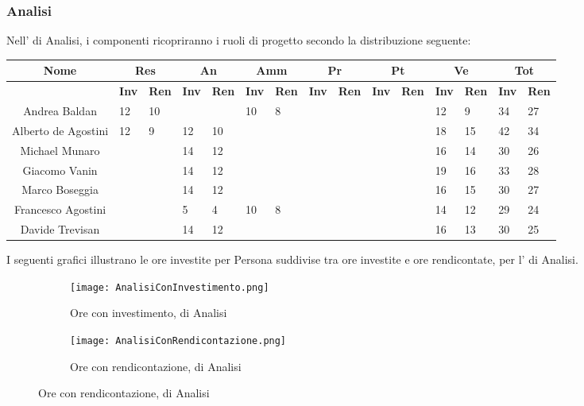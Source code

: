\documentclass{scalatekids-article}
\begin{document}
\subsubsection{Analisi}
Nell' di Analisi, i componenti ricopriranno i ruoli di progetto secondo la distribuzione seguente:
\begin{center}
  \scriptsize
  \begin{tabular}{| c | p{0.35cm} p{0.35cm} | p{0.35cm} p{0.35cm} | p{0.35cm} p{0.35cm} | p{0.35cm} p{0.35cm} | p{0.35cm} p{0.35cm} | p{0.35cm} p{0.35cm} | p{0.35cm} p{0.35cm} |}
    \hline
    \textbf{Nome} & \multicolumn{2}{|c|}{\textbf{Res}} & \multicolumn{2}{|c|}{\textbf{An}} & \multicolumn{2}{|c|}{\textbf{Amm}} & \multicolumn{2}{|c|}{\textbf{Pr}} & \multicolumn{2}{|c|}{\textbf{Pt}} & \multicolumn{2}{|c|}{\textbf{Ve}} & \multicolumn{2}{|c|}{\textbf{Tot}}\\
    \hline
    & \textbf{Inv} & \textbf{Ren} & \textbf{Inv} & \textbf{Ren} & \textbf{Inv} & \textbf{Ren} & \textbf{Inv} & \textbf{Ren} & \textbf{Inv} & \textbf{Ren} & \textbf{Inv} & \textbf{Ren} & \textbf{Inv} & \textbf{Ren}\\
    \hline
    Andrea Baldan & 12 & 10 & & & 10 & 8 & & & & & 12 & 9 & 34 & 27\\
    Alberto de Agostini & 12 & 9 & 12 & 10 & & & & & & & 18 & 15 & 42 & 34\\
    Michael Munaro & & & 14 & 12 & & & & & & & 16 & 14 & 30 & 26\\
    Giacomo Vanin & & & 14 & 12 & & & & & & & 19 & 16 & 33 & 28\\
    Marco Boseggia & & & 14 & 12 & & & & & & & 16 & 15 & 30 & 27\\
    Francesco Agostini & & & 5 & 4 & 10 & 8 & & & & & 14 & 12 & 29 & 24\\
    Davide Trevisan & & & 14 & 12 & & & & & & & 16 & 13 & 30 & 25\\
    \hline
  \end{tabular}
\end{center}
I seguenti grafici illustrano le ore investite per Persona suddivise tra ore investite e ore rendicontate, per l' di Analisi.
\begin{figure}[H]
  \begin{subfigure}[H]{0.47\textwidth}
    \texttt{[image: AnalisiConInvestimento.png]}
    \caption*{Ore con investimento,  di Analisi}
  \end{subfigure}
  \qquad
  \begin{subfigure}[H]{0.47\textwidth}
    \texttt{[image: AnalisiConRendicontazione.png]}
    \caption*{Ore con rendicontazione,  di Analisi}
  \end{subfigure}
\end{figure}
\end{document}
